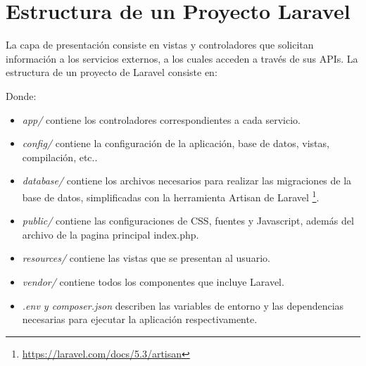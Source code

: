 \chapter{Estructura de un Proyecto Laravel}
La capa de presentación consiste en vistas y controladores que solicitan información a los servicios externos, a los cuales acceden a través de sus APIs.
\clearpage
La estructura de un proyecto de Laravel consiste en:

\vspace{0.5cm}
{
}
Donde:

\begin{itemize}
\item \textit{app/} contiene los controladores correspondientes a cada servicio.
\item \textit{config/} contiene la configuración de la aplicación, base de datos, vistas, compilación, etc..
\item \textit{database/} contiene los archivos necesarios para realizar las migraciones de la base de datos, simplificadas con la herramienta Artisan de Laravel \footnote{\url{https://laravel.com/docs/5.3/artisan}}.
\item \textit{public/} contiene las configuraciones de CSS, fuentes y Javascript, además del archivo de la pagina principal index.php.
\item \textit{resources/} contiene las vistas que se presentan al usuario.
\item \textit{vendor/} contiene todos los componentes que incluye Laravel.
\item \textit{.env y composer.json} describen las variables de entorno y las dependencias necesarias para ejecutar la aplicación respectivamente.

\end{itemize}

